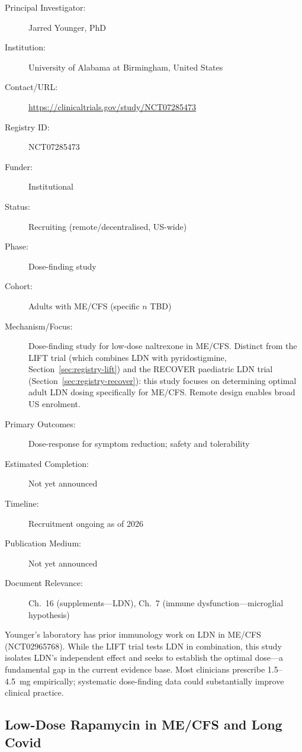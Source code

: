 \begin{description}
    \item[Principal Investigator:] Jarred Younger, PhD
    \item[Institution:] University of Alabama at Birmingham, United States
    \item[Contact/URL:] \url{https://clinicaltrials.gov/study/NCT07285473}
    \item[Registry ID:] NCT07285473
    \item[Funder:] Institutional
    \item[Status:] Recruiting (remote/decentralised, US-wide)
    \item[Phase:] Dose-finding study
    \item[Cohort:] Adults with ME/CFS (specific $n$ TBD)
    \item[Mechanism/Focus:] Dose-finding study for low-dose naltrexone in
        ME/CFS.  Distinct from the LIFT trial (which combines LDN with
        pyridostigmine, Section~\ref{sec:registry-lift}) and the RECOVER
        paediatric LDN trial (Section~\ref{sec:registry-recover}): this
        study focuses on determining optimal adult LDN dosing specifically
        for ME/CFS.  Remote design enables broad US enrolment.
    \item[Primary Outcomes:] Dose-response for symptom reduction;
        safety and tolerability
    \item[Estimated Completion:] Not yet announced
    \item[Timeline:] Recruitment ongoing as of 2026
    \item[Publication Medium:] Not yet announced
    \item[Document Relevance:] Ch.~16 (supplements---LDN),
        Ch.~7 (immune dysfunction---microglial hypothesis)
\end{description}

Younger's laboratory has prior immunology work on LDN in ME/CFS
(NCT02965768).  While the LIFT trial tests LDN in combination,
this study isolates LDN's independent effect and seeks to establish
the optimal dose---a fundamental gap in the current evidence base.
Most clinicians prescribe 1.5--4.5~mg empirically; systematic dose-finding
data could substantially improve clinical practice.

\subsection{Low-Dose Rapamycin in ME/CFS and Long Covid}
\label{sec:registry-rapamycin}

